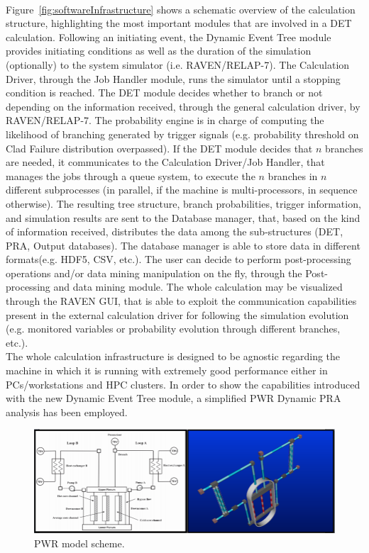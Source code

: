 \documentclass{mc2013}
\begin{document}
\\Figure~\ref{fig:softwareInfrastructure} shows a schematic overview of the calculation structure, highlighting the most important modules that are involved in a DET calculation. Following an initiating event, the Dynamic Event Tree module provides initiating conditions as well as the duration of the simulation (optionally) to the system simulator (i.e. RAVEN/RELAP-7). The Calculation Driver, through the Job Handler module, runs the simulator until a stopping condition is reached. The DET module decides whether to branch or not depending on the information received, through the general calculation driver, by RAVEN/RELAP-7. The probability engine is in charge of computing the likelihood of branching generated by trigger signals (e.g. probability threshold on Clad Failure distribution overpassed).  If the DET module decides that $n$ branches are needed, it communicates to the Calculation Driver/Job Handler, that manages the jobs through a queue system, to execute the $n$ branches in $n$ different subprocesses (in parallel, if the machine is multi-processors, in sequence otherwise). The resulting tree structure, branch probabilities, trigger information, and simulation results are sent to the Database manager, that, based on the kind of information received, distributes the data among the sub-structures (DET, PRA, Output databases). The database manager is able to store data in different formats(e.g. HDF5, CSV, etc.). The user can decide to perform post-processing operations and/or data mining manipulation on the fly, through the Post-processing and data mining module. The whole calculation may be visualized through the RAVEN GUI, that is able to exploit the communication capabilities present in the external calculation driver for following the simulation evolution (e.g. monitored variables or probability evolution through different branches, etc.). \\ The whole calculation infrastructure is designed to be agnostic regarding the machine in which it is running with extremely good performance either in PCs/workstations and HPC clusters. 
In order to show the capabilities introduced with the new Dynamic Event Tree module, a simplified PWR Dynamic PRA analysis has been employed.
\begin{figure}[h]
   \centering
    \includegraphics[width=1.0\textwidth]{figures/PWR_TMI_SCHEME.PNG}
    \caption{PWR model scheme.}
    \label{fig:PWRmodel}
\end{figure}
\end{document}
